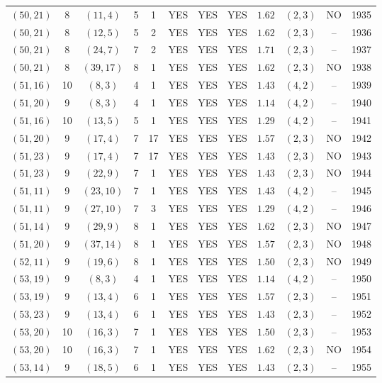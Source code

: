\begin{longtable}{|c|c|c|c|c|c|c|c|c|c|c|c|}
$(50,21)$ & 8 & $(11,4)$ & 5 & 1 & YES & YES & YES & $1.62$ & $(2,3)$ & NO & 1935\\
$(50,21)$ & 8 & $(12,5)$ & 5 & 2 & YES & YES & YES & $1.62$ & $(2,3)$ & -- & 1936\\
$(50,21)$ & 8 & $(24,7)$ & 7 & 2 & YES & YES & YES & $1.71$ & $(2,3)$ & -- & 1937\\
$(50,21)$ & 8 & $(39,17)$ & 8 & 1 & YES & YES & YES & $1.62$ & $(2,3)$ & NO & 1938\\
$(51,16)$ & 10 & $(8,3)$ & 4 & 1 & YES & YES & YES & $1.43$ & $(4,2)$ & -- & 1939\\
$(51,20)$ & 9 & $(8,3)$ & 4 & 1 & YES & YES & YES & $1.14$ & $(4,2)$ & -- & 1940\\
$(51,16)$ & 10 & $(13,5)$ & 5 & 1 & YES & YES & YES & $1.29$ & $(4,2)$ & -- & 1941\\
$(51,20)$ & 9 & $(17,4)$ & 7 & 17 & YES & YES & YES & $1.57$ & $(2,3)$ & NO & 1942\\
$(51,23)$ & 9 & $(17,4)$ & 7 & 17 & YES & YES & YES & $1.43$ & $(2,3)$ & NO & 1943\\
$(51,23)$ & 9 & $(22,9)$ & 7 & 1 & YES & YES & YES & $1.43$ & $(2,3)$ & NO & 1944\\
$(51,11)$ & 9 & $(23,10)$ & 7 & 1 & YES & YES & YES & $1.43$ & $(4,2)$ & -- & 1945\\
$(51,11)$ & 9 & $(27,10)$ & 7 & 3 & YES & YES & YES & $1.29$ & $(4,2)$ & -- & 1946\\
$(51,14)$ & 9 & $(29,9)$ & 8 & 1 & YES & YES & YES & $1.62$ & $(2,3)$ & NO & 1947\\
$(51,20)$ & 9 & $(37,14)$ & 8 & 1 & YES & YES & YES & $1.57$ & $(2,3)$ & NO & 1948\\
$(52,11)$ & 9 & $(19,6)$ & 8 & 1 & YES & YES & YES & $1.50$ & $(2,3)$ & NO & 1949\\
$(53,19)$ & 9 & $(8,3)$ & 4 & 1 & YES & YES & YES & $1.14$ & $(4,2)$ & -- & 1950\\
$(53,19)$ & 9 & $(13,4)$ & 6 & 1 & YES & YES & YES & $1.57$ & $(2,3)$ & -- & 1951\\
$(53,23)$ & 9 & $(13,4)$ & 6 & 1 & YES & YES & YES & $1.43$ & $(2,3)$ & -- & 1952\\
$(53,20)$ & 10 & $(16,3)$ & 7 & 1 & YES & YES & YES & $1.50$ & $(2,3)$ & -- & 1953\\
$(53,20)$ & 10 & $(16,3)$ & 7 & 1 & YES & YES & YES & $1.62$ & $(2,3)$ & NO & 1954\\
$(53,14)$ & 9 & $(18,5)$ & 6 & 1 & YES & YES & YES & $1.43$ & $(2,3)$ & -- & 1955\\

\end{longtable}
